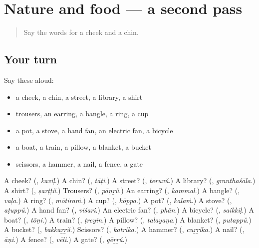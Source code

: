 \section[(dialogue)]{Nature and food — a second pass}

\label{lesson:ML-R159-second-pass-nature-and-food}



\begin{quote}
Say the words for a cheek and a chin.
\end{quote}

\subsection*{Your turn}
Say these aloud:

\begin{itemize}
\raggedright
  \item a cheek, a chin, a street, a library, a shirt
  \item trousers, an earring, a bangle, a ring, a cup
  \item a pot, a stove, a hand fan, an electric fan, a bicycle
  \item a boat, a train, a pillow, a blanket, a bucket
  \item scissors, a hammer, a nail, a fence, a gate
\end{itemize}

\begin{tcolorbox}[breakable,colback=teal!4,colframe=teal!35!black,title={Before you move on}]
A cheek? (\textbf{}, \emph{kaviḷ}.) A chin? (\textbf{}, \emph{tāṭi}.) A street? (\textbf{}, \emph{teruvŭ}.) A library? (\textbf{}, \emph{granthaśāla}.) A shirt? (\textbf{}, \emph{ṣarṭṭŭ}.) Trousers? (\textbf{}, \emph{pāṇṟŭ}.) An earring? (\textbf{}, \emph{kammal}.) A bangle? (\textbf{}, \emph{vaḷa}.) A ring? (\textbf{}, \emph{mōtiraṁ}.) A cup? (\textbf{}, \emph{kōppa}.) A pot? (\textbf{}, \emph{kalaṁ}.) A stove? (\textbf{}, \emph{aṭuppŭ}.) A hand fan? (\textbf{}, \emph{viśari}.) An electric fan? (\textbf{}, \emph{phān}.) A bicycle? (\textbf{}, \emph{saikkiḷ}.) A boat? (\textbf{}, \emph{tōṇi}.) A train? (\textbf{}, \emph{ṭreyin}.) A pillow? (\textbf{}, \emph{talayaṇa}.) A blanket? (\textbf{}, \emph{putappŭ}.) A bucket? (\textbf{}, \emph{bakkaṟṟŭ}.) Scissors? (\textbf{}, \emph{katrika}.) A hammer? (\textbf{}, \emph{cuṟṟika}.) A nail? (\textbf{}, \emph{āṇi}.) A fence? (\textbf{}, \emph{vēli}.) A gate? (\textbf{}, \emph{gēṟṟŭ}.)
\end{tcolorbox}
